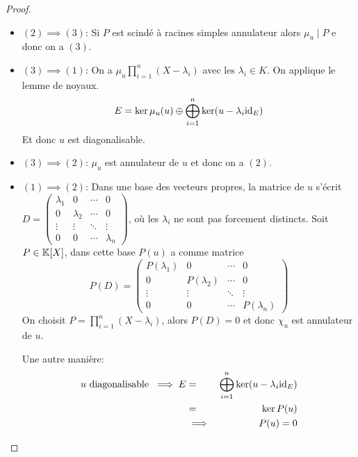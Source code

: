 \begin{proof}
	\begin{itemize}
		\item $(2) \implies (3)$: Si $P$ est scindé à racines simples annulateur alors $\mu_u \mid P$ e donc on a $(3)$.
		\item $(3) \implies (1)$: On a $\mu_u \prod_{i=1}^n (X - \lambda_i)$ avec les $\lambda_i \in K$. On applique le lemme de noyaux.
		      $$ E = \ker \mu_u(u) \oplus \bigoplus_{i=1}^n \ker(u - \lambda_i \text{id}_E) $$
		      Et donc $u$ est diagonalisable.
		\item $(3) \implies (2)$: $\mu_u$ est annulateur de $u$ et donc on a $(2)$.
		\item $(1) \implies (2)$: Dans une base des vecteurs propres, la matrice de $u$ s'écrit $D = \begin{pmatrix}
				      \lambda_1 & 0         & \cdots & 0         \\
				      0         & \lambda_2 & \cdots & 0         \\
				      \vdots    & \vdots    & \ddots & \vdots    \\
				      0         & 0         & \cdots & \lambda_n
			      \end{pmatrix}$, où les $\lambda_i$ ne sont pas forcement distincts.
		      Soit $P \in \mathbb{K}[X]$, dans cette base $P(u)$ a comme matrice
		      $$P(D) = \begin{pmatrix}
				      P(\lambda_1) & 0            & \cdots & 0            \\
				      0            & P(\lambda_2) & \cdots & 0            \\
				      \vdots       & \vdots       & \ddots & \vdots       \\
				      0            & 0            & \cdots & P(\lambda_n)
			      \end{pmatrix}$$
		      On choisit $P = \prod_{i=1}^n (X - \lambda_i)$, alors $P(D) = 0$ et donc $\chi_u$ est annulateur de $u$.

		      Une autre manière:
		      \begin{eqnarray*}
			      u \text{ diagonalisable } \implies E &=& \bigoplus_{i=1}^n \ker(u - \lambda_i \text{id}_E) \\
			      &=& \ker P(u) \\
			      &\implies& P(u) = 0
		      \end{eqnarray*}
	\end{itemize}
\end{proof}

